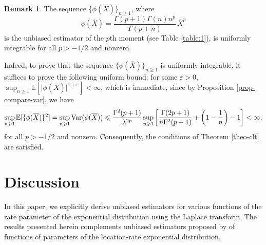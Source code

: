 \documentclass[12pt]{article}
\theoremstyle{definition}
\newtheorem{remark}[theorem]{Remark}
\begin{document}
\begin{remark}
	The sequence $\{\phi(\overline{X})\}_{n\geqslant 1}$, where
	$$\phi(\overline{X})=\dfrac{\Gamma(p+1)\Gamma(n) n^p}{\Gamma(p+n)} \, \overline{X}^{p}$$
	is the unbiased estimator of the $p$th  moment (see Table \ref{table:1}), is uniformly integrable for all $p>-1/2$ and nonzero.
	
	Indeed, to prove that the sequence $\{\phi(\overline{X})\}_{n\geqslant 1}$ is uniformly integrable, it suffices to prove the following uniform bound: for some $\varepsilon>0$, $\sup_{n\geqslant 1}\mathbb{E}[\vert\phi(\overline{X})\vert^{1+\varepsilon}]<\infty$, which is immediate, since by Proposition \ref{prop-compare-var}, we have 
	\begin{align*}
		\sup_{n\geqslant 1}
		\mathbb{E}[\{\phi(\overline{X})\}^{2}]
		=
		\sup_{n\geqslant 1}
		{\rm Var}(\phi(\overline{X}))
		\leqslant
		{\Gamma^2(p+1)\over\lambda^{2p}}
		\sup_{n\geqslant 1}
		\left[
		{\Gamma(2p+1)\over n\Gamma^2(p+1) }
		+
		\left(1-{1\over n}\right)
		-
		1
		\right]
		<\infty,
	\end{align*}
	for all $p>-1/2$ and nonzero. Consequently, the conditions of Theorem \ref{theo-clt} are satisfied.
\end{remark}










\section{Discussion}

In this paper, we explicitly derive unbiased estimators for various functions of the rate parameter of the exponential distribution using the Laplace transform. 
%
{\color{black}
The results presented herein complements unbiased estimators proposed by \cite{Tate1959} of functions of parameters of the location-rate exponential distribution. }

\end{document}
